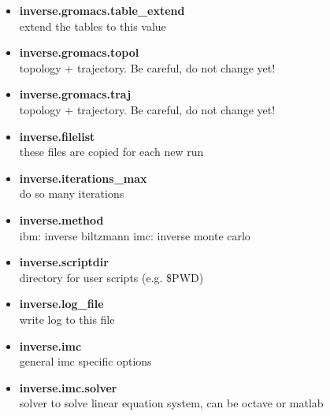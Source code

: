\begin{itemize}
\item \textbf{inverse.gromacs.table\_extend} \\
 extend the tables to this value 
\item \textbf{inverse.gromacs.topol} \\
 topology + trajectory. Be careful, do not change yet! 
\item \textbf{inverse.gromacs.traj} \\
 topology + trajectory. Be careful, do not change yet! 
\item \textbf{inverse.filelist} \\
 these files are copied for each new run 
\item \textbf{inverse.iterations\_max} \\
 do so many iterations 
\item \textbf{inverse.method} \\
 ibm: inverse biltzmann imc: inverse monte carlo 
\item \textbf{inverse.scriptdir} \\
 directory for user scripts (e.g. \$PWD)
\item \textbf{inverse.log\_file} \\
 write log to this file 
\item \textbf{inverse.imc} \\
 general imc specific options 
\item \textbf{inverse.imc.solver} \\
 solver to solve linear equation system, can be octave or matlab 
\end{itemize}
